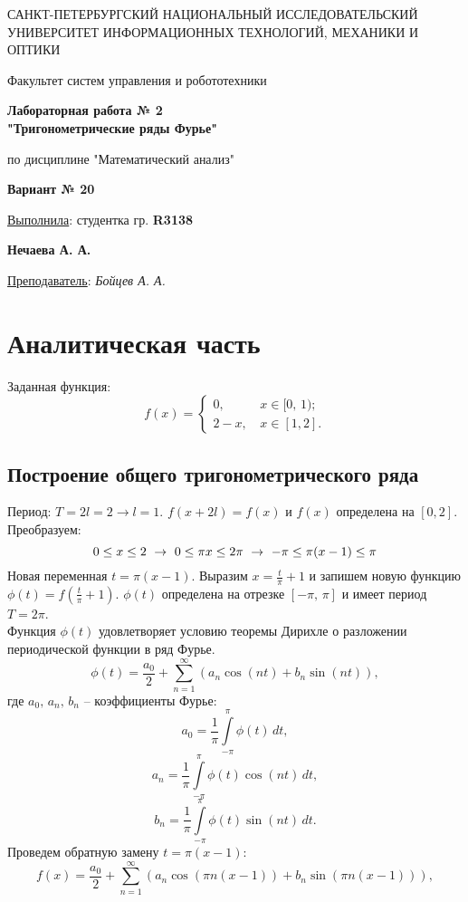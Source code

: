 \documentclass[a5paper, 10pt]{article}
\theoremstyle{definition}
\theoremstyle{plain}
\theoremstyle{remark}
\newcommand*{\titlePage}{
	\thispagestyle{title}
	\begingroup
	\begin{center}
		\vspace*{6ex}
		
		{\small
			САНКТ-ПЕТЕРБУРГСКИЙ НАЦИОНАЛЬНЫЙ ИССЛЕДОВАТЕЛЬСКИЙ УНИВЕРСИТЕТ ИНФОРМАЦИОННЫХ ТЕХНОЛОГИЙ, МЕХАНИКИ И ОПТИКИ	
		}
		
		\vspace*{2ex}
		
		{\normalsize
			Факультет систем управления и робототехники
		}
		
		\vspace*{15ex}
		
		{\Large \bfseries 
			Лабораторная работа № 2\\
"Тригонометрические ряды Фурье"
		}
\vspace*{2ex}
		
		{\normalsize
			по дисциплине "Математический анализ"
		}

                    \vspace*{2ex}

                    { \bfseries 
			Вариант № 20
		}
	\end{center}
	\vspace*{20ex}
	\begin{flushright}
		{\large 
			\underline{Выполнила}: студентка гр. \textbf{R3138}\\
			\begin{flushright}
				\textbf{Нечаева А. А.}\\
			\end{flushright}
		}
		
		\vspace*{5ex}
		
		{\large 
			\underline{Преподаватель}: \textit{Бойцев А. А.}
		}
	\end{flushright}	
	\newpage
	\setcounter{page}{2}
	\endgroup}
\begin{document}
	\titlePage
	\pagestyle{style}
\newpage

\section{Аналитическая часть}
Заданная функция:
\begin{equation}
f(x) = 
\begin{cases}
0, \, & x \in [0, \, 1);\\
2 - x, \, & x \in [1, 2].
\end{cases}
\end{equation}


\subsection{Построение общего тригонометрического ряда}	
Период: $T = 2l = 2 \to l = 1$. $f(x+2l)=f(x)$ и $f(x)$ определена на $[0, 2]$. Преобразуем:
\begin{equation*}
0 \leq x \leq 2  \, \, \to \, \,
0 \leq \pi x \leq 2 \pi \, \, \to \, \,
-\pi \leq \pi(x-1) \leq \pi\\
\end{equation*}
Новая переменная $t =\pi(x-1)$. Выразим $x = \frac{t}{\pi} + 1$ и запишем новую функцию $\phi (t) = f( \frac{t}{\pi} + 1)$. $\phi (t)$ определена на отрезке $[-\pi, \, \pi]$ и имеет период $T = 2 \pi$.\\
Функция $\phi (t)$ удовлетворяет условию теоремы Дирихле о разложении периодической функции в ряд Фурье.
\begin{equation*}
\phi (t) = \frac{a_0}{2} + \sum \limits_{n = 1}^{\infty} \left( a_n \cos(nt) + b_n \sin(nt) \right), 
\end{equation*}
где $a_0, \, a_n, \, b_n$ -- коэффициенты Фурье:\\
\begin{equation*}
a_0 = \frac{1}{\pi} \int \limits_{-\pi}^{\pi} \phi(t) \, dt,
\end{equation*}
\begin{equation*}
a_n = \frac{1}{\pi} \int \limits_{-\pi}^{\pi} \phi(t) \cos(nt) \, dt,
\end{equation*}
\begin{equation*}
b_n = \frac{1}{\pi} \int \limits_{-\pi}^{\pi} \phi(t) \sin(nt) \, dt.
\end{equation*}
Проведем обратную замену $t =\pi(x-1)$:
\begin{equation*}
f (x) = \frac{a_0}{2} + \sum \limits_{n = 1}^{\infty} \left( a_n \cos(\pi n(x-1)) + b_n \sin(\pi n(x-1)) \right), 
\end{equation*}
\end{document}
